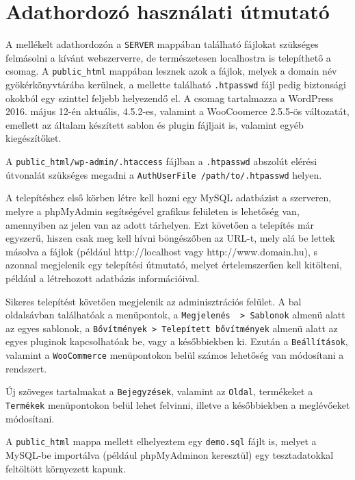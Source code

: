 \chapter*{Adathordozó használati útmutató}

A mellékelt adathordozón a \texttt{SERVER} mappában található fájlokat szükséges felmásolni a kívánt webszerverre, de természetesen localhostra is telepíthető a csomag. A \texttt{public\_html} mappában lesznek azok a fájlok, melyek a domain név gyökérkönyvtárába kerülnek, a mellette található \texttt{.htpasswd} fájl pedig biztonsági okokból egy szinttel feljebb helyezendő el. A csomag tartalmazza a WordPress 2016. május 12-én aktuális, 4.5.2-es, valamint a WooCoomerce 2.5.5-ös változatát, emellett az általam készített sablon és plugin fájljait is, valamint egyéb kiegészítőket.

 A \texttt{public\_html/wp-admin/.htaccess} fájlban a \texttt{.htpasswd} abszolút elérési útvonalát szükséges megadni a \texttt{AuthUserFile /path/to/.htpasswd} helyen.

A telepítéshez első körben létre kell hozni egy MySQL adatbázist a szerveren, melyre a phpMyAdmin segítségével grafikus felületen is lehetőség van, amennyiben az jelen van az adott tárhelyen. Ezt követően a telepítés már egyszerű, hiszen csak meg kell hívni böngészőben az URL-t, mely alá be lettek másolva a fájlok (például http://localhost vagy http://www.domain.hu), s azonnal megjelenik egy telepítési útmutató, melyet értelemszerűen kell kitölteni, például a létrehozott adatbázis információival.

Sikeres telepítést követően megjelenik az adminisztrációs felület. A bal oldalsávban találhatóak a menüpontok, a \verb|Megjelenés  > Sablonok|  almenü alatt az egyes sablonok, a \verb|Bővítmények > Telepített bővítmények| almenü alatt az egyes pluginok kapcsolhatóak be, vagy a későbbiekben ki. Ezután a \texttt{Beállítások}, valamint a \texttt{WooCommerce} menüpontokon belül számos lehetőség van módosítani a rendszert.

Új szöveges tartalmakat a \texttt{Bejegyzések}, valamint az \texttt{Oldal}, termékeket a \texttt{Termékek} menüpontokon belül lehet felvinni, illetve a későbbiekben a meglévőeket módosítani.

A \verb|public_html| mappa mellett elhelyeztem egy \verb|demo.sql| fájlt is, melyet a MySQL-be importálva (például phpMyAdminon keresztül) egy tesztadatokkal feltöltött környezett kapunk.